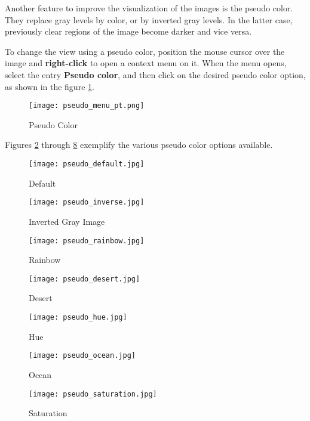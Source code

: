 Another feature to improve the visualization of the images is the pseudo color. They replace gray levels by color, or by inverted gray levels. In the latter case, previously clear regions of the image become darker and vice versa.

To change the view using a pseudo color, position the mouse cursor over the image and \textbf{right-click} to open a context menu on it. When the menu opens, select the entry \textbf{Pseudo color}, and then click on the desired pseudo color option, as shown in the figure \ref{fig:pseudo_color}.

\begin{figure}[H]
\centering
\texttt{[image: pseudo\_menu\_pt.png]}
\caption{Pseudo Color}
\label{fig:pseudo_color}
\end{figure}

Figures \ref{fig:image_default} through \ref{fig:image_saturation} exemplify the various pseudo color options available.\\

\begin{figure}[H]
\centering
\texttt{[image: pseudo\_default.jpg]}
\caption{Default}
\label{fig:image_default}
\end{figure}

\begin{figure}[H]
\centering
\texttt{[image: pseudo\_inverse.jpg]}
\caption{Inverted Gray Image}
\label{fig:image_inverted}
\end{figure}

\begin{figure}[H]
\centering
\texttt{[image: pseudo\_rainbow.jpg]}
\caption{Rainbow}
\label{fig:image_arc}
\end{figure}

\begin{figure}[H]
\centering
\texttt{[image: pseudo\_desert.jpg]}
\caption{Desert}
\label{fig:image_desert}
\end{figure}

\begin{figure}[H]
\centering
\texttt{[image: pseudo\_hue.jpg]}
\caption{Hue}
\label{fig:image_matiz}
\end{figure}

\begin{figure}[H]
\centering
\texttt{[image: pseudo\_ocean.jpg]}
\caption{Ocean}
\label{fig:image_ocean}
\end{figure}

\begin{figure}[H]
\centering
\texttt{[image: pseudo\_saturation.jpg]}
\caption{Saturation}
\label{fig:image_saturation}
\end{figure}

